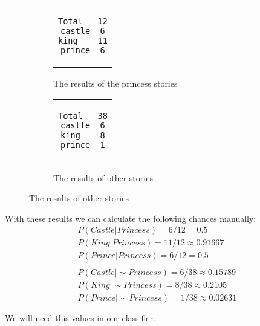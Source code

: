 \documentclass{article}
\begin{document}
\begin{figure}[!ht]
\centering
\begin{subfigure}{.5\textwidth}
\centering
\begin{tabular}{c}
\begin{lstlisting}
Total	12
castle	6
king 	11
prince	6
\end{lstlisting}
\end{tabular}
\label{fig:results_princes}
\caption{The results of the princess stories}
\end{subfigure}
\begin{subfigure}{.4\textwidth}
\centering
\begin{tabular}{c}
\begin{lstlisting}
Total	38
castle	6
king	8
prince	1
\end{lstlisting}
\end{tabular}
\label{fig:results_other}
\caption{The results of other stories}
\end{subfigure}
\end{figure}
\FloatBarrier
With these results we can calculate the following chances manually:
\FloatBarrier
\begin{gather*}
P(Castle | Princess) = 6/12 = 0.5\\
P(King | Princess) = 11/12 \approx 0.91667\\
P(Prince | Princess) = 6/12 = 0.5\\ \\
P(Castle | \sim Princess) = 6/38 \approx 0.15789\\
P(King | \sim Princess) = 8/38 \approx 0.2105\\
P(Prince | \sim Princess) = 1/38 \approx 0.02631\\ \\
\end{gather*}
We will need this values in our classifier.
\end{document}

